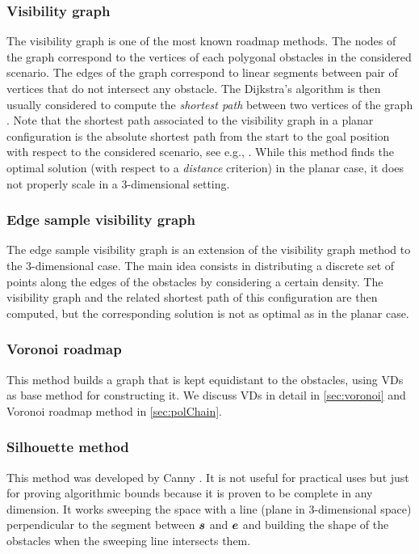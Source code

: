\documentclass[dissertation.tex]{subfiles}
\begin{document}
\subsubsection{Visibility graph}
The visibility graph is one of the most known roadmap methods. The
nodes of the graph correspond to the vertices of each polygonal
obstacles in the considered scenario. The edges of the graph
correspond to linear segments between pair of vertices that do not
intersect any obstacle. The Dijkstra's algorithm is then usually
considered to compute the \emph{shortest path} between two vertices of
the graph \cite{dijkstra}.  Note
that the shortest path associated to the visibility graph in a planar
configuration is the absolute shortest path from the start to the goal
position with respect to the considered scenario, see e.g.,
\cite{deberg}. While this method finds the optimal solution (with respect to a
\emph{distance} criterion) in the planar case, it does not properly
scale in a 3-dimensional setting.

\subsubsection{Edge sample visibility graph}
The edge sample visibility graph is an extension of the visibility
graph method to the 3-dimensional case. The main idea consists in
distributing a discrete set of points along the edges of the obstacles
by considering  a certain density. The visibility graph and the related
shortest path of this configuration are then computed, but the
corresponding solution is not as optimal as in the planar case.

\subsubsection{Voronoi roadmap}
This method builds a graph that is kept equidistant to the obstacles,
using
\acp{VD} as base method for constructing it. We discuss \acp{VD}
in detail in \cref{sec:voronoi} and Voronoi roadmap method in
\cref{sec:polChain}.

\subsubsection{Silhouette method}
This method was developed by Canny \cite{canny}. It is not useful for
practical uses but just for
proving algorithmic bounds because it is proven to be complete in any
dimension. It works sweeping the space with a line (plane in
3-dimensional space) perpendicular to the
segment between $\boldsymbol{s}$ and $\boldsymbol{e}$ and building the shape of the
obstacles when the sweeping line intersects them.
\end{document}
